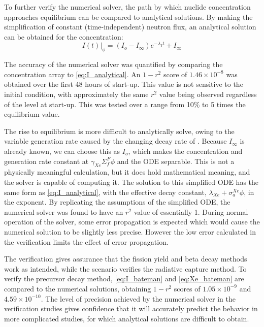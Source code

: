 To further verify the numerical solver, the path by which nuclide concentration approaches equilibrium can be compared to analytical solutions. By making the simplification of constant (time-independent) neutron flux, an analytical solution can be obtained for the \I concentration:
\begin{equation}\label{eq:I_analytical}
\left.I(t)\right\rvert_\phi = (I_o-I_\infty)e^{-\lambda_I t}+I_\infty
\end{equation}

The accuracy of the numerical solver was quantified by comparing the \I concentration array to \ref{eq:I_analytical}. An $1-r^2$ score of $1.46\times10^{-8}$ was obtained over the first 48 hours of start-up. This value is not sensitive to the initial condition, with approximately the same $r^2$ value being observed regardless of the \I level at start-up. This was tested over a range from 10\% to 5 times the equilibrium value.

The \Xe rise to equilibrium is more difficult to analytically solve, owing to the variable generation rate caused by the changing decay rate of \I. Because $I_\infty$ is already known, we can choose this as $I_o$, which makes the \I concentration and \Xe generation rate constant at $\gamma_{Xe}\Sigma_{f}^{F}{\phi}$ and the ODE separable. This is not a physically meaningful calculation, but it does hold mathematical meaning, and the solver is capable of computing it. The solution to this simplified ODE has the same form as \ref{eq:I_analytical}, with the effective decay constant, $\lambda_{Xe}+\sigma_a^{Xe}\phi$, in the exponent. By replicating the assumptions of the simplified ODE, the numerical solver was found to have an $r^2$ value of essentially 1. During normal operation of the solver, some error propagation is expected which would cause the numerical \Xe solution to be slightly less precise. However the low error calculated in the \I verification limits the effect of error propagation.

The \I verification gives assurance that the fission yield and beta decay methods work as intended, while the \Xe scenario verifies the radiative capture method. To verify the precursor decay method, \ref{eq:I_bateman} and \ref{eq:Xe_bateman} are compared to the numerical solutions, obtaining $1-r^2$ scores of $1.05\times10^{-9}$ and $4.59\times10^{-10}$. The level of precision achieved by the numerical solver in the verification studies gives confidence that it will accurately predict the behavior in more complicated studies, for which analytical solutions are difficult to obtain.

